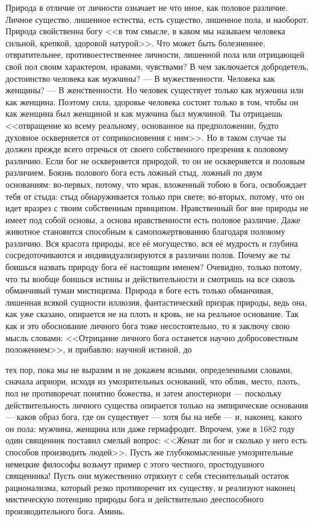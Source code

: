 \documentclass[12pt,oneside]{book}
\begin{document}
Природа в отличие от личности означает не что иное, как половое различие. Личное существо, лишенное естества, есть существо, лишенное пола, и наоборот. Природа свойственна богу <<в том смысле, в каком мы называем человека сильной, крепкой, здоровой натурой>>. Что может быть болезненнее, отвратительнее, противоестественнее личности, лишенной пола или отрицающей свой пол своим характером, нравами, чувствами? В чем заключается добродетель, достоинство человека как мужчины? --- В мужественности. Человека как женщины? --- В женственности. Но человек существует только как мужчина или как женщина. Поэтому сила, здоровье человека состоит только в том, чтобы он как женщина был женщиной и как мужчина был мужчиной. Ты отрицаешь <<отвращение ко всему реальному, основанное на предположении, будто духовное оскверняется от соприкосновения с ним>>. Но в таком случае ты должен прежде всего отречься от своего собственного презрения к половому различию. Если бог не оскверняется природой, то он не оскверняется и половым различием. Боязнь полового бога есть ложный стыд, ложный по двум основаниям: во-первых, потому, что мрак, вложенный тобою в бога, освобождает тебя от стыда: стыд обнаруживается только при свете; во-вторых, потому, что он идет вразрез с твоим собственным принципом. Нравственный бог вне природы не имеет под собой основы, а основа нравственности есть половое различие. Даже животное становится способным к самопожертвованию благодаря половому различию. Вся красота природы, все её могущество, вся её мудрость и глубина сосредоточиваются и индивидуализируются в различии полов. Почему же ты боишься назвать природу бога её настоящим именем? Очевидно, только потому, что ты вообще боишься истины и действительности и смотришь на все сквозь обманчивый туман мистицизма. Природа в боге есть только обманчивая, лишенная всякой сущности иллюзия, фантастический призрак природы, ведь она, как уже сказано, опирается не на плоть и кровь, не на реальное основание. Так как и это обоснование личного бога тоже несостоятельно, то я заключу свою мысль словами: <<Отрицание личного бога останется научно добросовестным положением>>, и прибавлю: научной истиной, до

тех пор, пока мы не выразим и не докажем ясными, определенными словами, сначала априори, исходя из умозрительных оснований, что облик, место, плоть, пол не противоречат понятию божества, и затем апостериори --- поскольку действительность личного существа опирается только на эмпирические основания --- каков образ бога, где он существует --- хотя бы на небе --- и, наконец, какого он пола: мужчина, женщина или даже гермафродит. Впрочем, уже в 1682 году один священник поставил смелый вопрос: <<Женат ли бог и сколько у него есть способов производить людей>>. Пусть же глубокомысленные умозрительные немецкие философы возьмут пример с этого честного, простодушного священника! Пусть они мужественно отряхнут с себя стеснительный остаток рационализма, который резко противоречит их существу, и реализуют наконец мистическую потенцию природы бога и действительно дееспособного производительного бога. Аминь.
\end{document}

